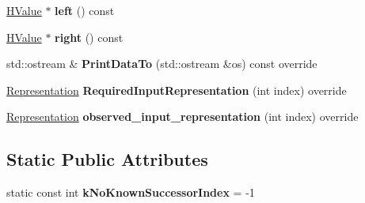 \begin{DoxyCompactItemize}
\item 
\hyperlink{classv8_1_1internal_1_1_h_value}{H\+Value} $\ast$ {\bfseries left} () const \hypertarget{classv8_1_1internal_1_1_h_compare_object_eq_and_branch_ab147ef5fc035e98b47bb22707d262366}{}\label{classv8_1_1internal_1_1_h_compare_object_eq_and_branch_ab147ef5fc035e98b47bb22707d262366}

\item 
\hyperlink{classv8_1_1internal_1_1_h_value}{H\+Value} $\ast$ {\bfseries right} () const \hypertarget{classv8_1_1internal_1_1_h_compare_object_eq_and_branch_a228710cccc67f3401d2658b02f2738a3}{}\label{classv8_1_1internal_1_1_h_compare_object_eq_and_branch_a228710cccc67f3401d2658b02f2738a3}

\item 
std\+::ostream \& {\bfseries Print\+Data\+To} (std\+::ostream \&os) const  override\hypertarget{classv8_1_1internal_1_1_h_compare_object_eq_and_branch_a38f0f7e191f48e2a43bf167444023225}{}\label{classv8_1_1internal_1_1_h_compare_object_eq_and_branch_a38f0f7e191f48e2a43bf167444023225}

\item 
\hyperlink{classv8_1_1internal_1_1_representation}{Representation} {\bfseries Required\+Input\+Representation} (int index) override\hypertarget{classv8_1_1internal_1_1_h_compare_object_eq_and_branch_a8b9f3f68facf396355d5527125aca930}{}\label{classv8_1_1internal_1_1_h_compare_object_eq_and_branch_a8b9f3f68facf396355d5527125aca930}

\item 
\hyperlink{classv8_1_1internal_1_1_representation}{Representation} {\bfseries observed\+\_\+input\+\_\+representation} (int index) override\hypertarget{classv8_1_1internal_1_1_h_compare_object_eq_and_branch_a785bbde7ecba19fb8dd5eb6c0e6dd747}{}\label{classv8_1_1internal_1_1_h_compare_object_eq_and_branch_a785bbde7ecba19fb8dd5eb6c0e6dd747}

\end{DoxyCompactItemize}
\subsection*{Static Public Attributes}
\begin{DoxyCompactItemize}
\item 
static const int {\bfseries k\+No\+Known\+Successor\+Index} = -\/1\hypertarget{classv8_1_1internal_1_1_h_compare_object_eq_and_branch_a6def7a4539c92dbad898bf79976cc2ee}{}\label{classv8_1_1internal_1_1_h_compare_object_eq_and_branch_a6def7a4539c92dbad898bf79976cc2ee}

\end{DoxyCompactItemize}
